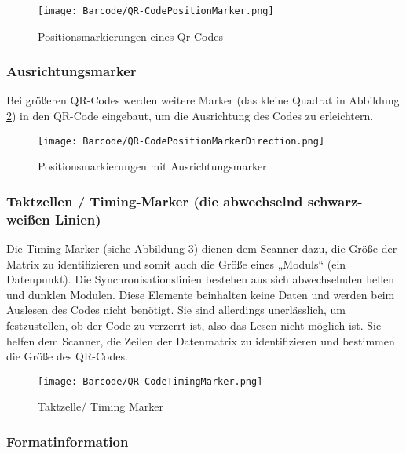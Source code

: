 \begin{figure}
    \centering
    \texttt{[image: Barcode/QR-CodePositionMarker.png]}
    \caption{Positionsmarkierungen eines Qr-Codes}
    \label{Positionsmarkierungen eines Qr-Codes}
\end{figure}

\newpage

\subsubsection{Ausrichtungsmarker}

{Bei größeren QR-Codes werden weitere Marker (das kleine Quadrat in Abbildung \ref{Positionsmarkierungen mit Ausrichtungsmarker}) in den QR-Code eingebaut, um die Ausrichtung des Codes zu erleichtern. \cite{Mishra:2017}
}

\begin{figure}[]
    \centering
    \texttt{[image: Barcode/QR-CodePositionMarkerDirection.png]}
    \caption{Positionsmarkierungen mit Ausrichtungsmarker}
    \label{Positionsmarkierungen mit Ausrichtungsmarker}
\end{figure}


\subsubsection{Taktzellen / Timing-Marker (die abwechselnd schwarz-weißen Linien) }

{Die Timing-Marker (siehe Abbildung \ref{Taktzelle/ Timing Marker }) dienen dem Scanner dazu, die Größe der Matrix zu identifizieren und somit 
    auch die Größe eines „Moduls“ (ein Datenpunkt).
    Die Synchronisationslinien bestehen aus sich abwechselnden hellen und dunklen Modulen.
    Diese Elemente beinhalten keine Daten und werden beim Auslesen des Codes nicht benötigt. Sie 
    sind allerdings unerlässlich, um festzustellen, 
    ob der Code zu verzerrt ist, also das Lesen nicht möglich ist.
    Sie helfen dem Scanner, die Zeilen der Datenmatrix zu identifizieren und bestimmen die Größe des QR-Codes.  \cite{Mishra:2017}
}

\begin{figure}
    \centering
    \texttt{[image: Barcode/QR-CodeTimingMarker.png]}
    \caption{Taktzelle/ Timing Marker }
    \label{Taktzelle/ Timing Marker }
\end{figure}

\newpage

\subsubsection{Formatinformation }


